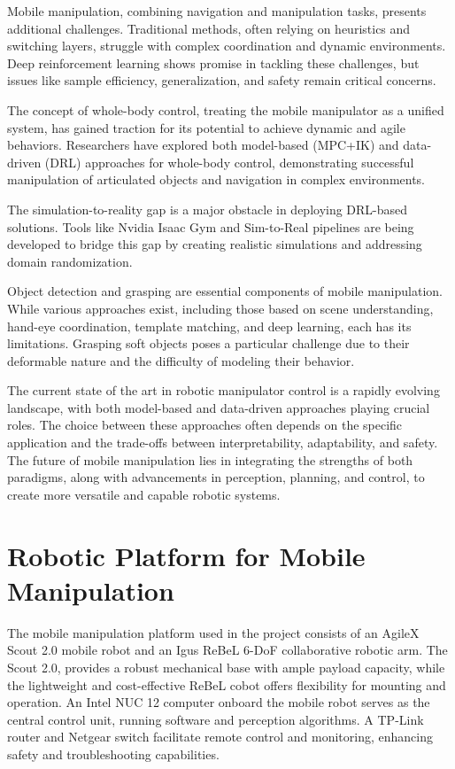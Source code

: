 Mobile manipulation, combining navigation and manipulation tasks, presents additional challenges. Traditional methods, 
often relying on heuristics and switching layers, struggle with complex coordination and dynamic environments. 
Deep reinforcement learning shows promise in tackling these challenges, but issues like sample efficiency, generalization,
and safety remain critical concerns.

The concept of whole-body control, treating the mobile manipulator as a unified system, has gained traction for its potential
to achieve dynamic and agile behaviors. Researchers have explored both model-based (MPC+IK) \cite{mittal2022articulated}
and data-driven (DRL) approaches \cite{fu2022deeplegged} for whole-body control, 
demonstrating successful manipulation of articulated objects and navigation in complex environments.

The simulation-to-reality gap is a major obstacle in deploying DRL-based solutions. Tools like Nvidia Isaac Gym and
Sim-to-Real pipelines are being developed to bridge this gap by creating realistic simulations and addressing domain 
randomization.

Object detection and grasping are essential components of mobile manipulation. While various approaches exist, 
including those based on scene understanding, hand-eye coordination, template matching, and deep learning, each has
its limitations. Grasping soft objects poses a particular challenge due to their deformable nature and the difficulty
of modeling their behavior.

The current state of the art in robotic manipulator control is a rapidly evolving landscape, with both model-based 
and data-driven approaches playing crucial roles. The choice between these approaches often depends on the specific 
application and the trade-offs between interpretability, adaptability, and safety. The future of mobile manipulation 
lies in integrating the strengths of both paradigms, along with advancements in perception, planning, and control, 
to create more versatile and capable robotic systems.

\section{Robotic Platform for Mobile Manipulation}

The mobile manipulation platform used in the project consists of an AgileX Scout 2.0 mobile robot and an Igus ReBeL
6-DoF collaborative robotic arm. The Scout 2.0,
provides a robust mechanical base with ample payload capacity, while the lightweight and cost-effective ReBeL
cobot offers flexibility for mounting and operation.
An Intel NUC 12 computer onboard the mobile robot serves as the central control unit, running software and perception 
algorithms. A TP-Link router and Netgear switch facilitate remote control and monitoring, enhancing safety and
troubleshooting capabilities.

